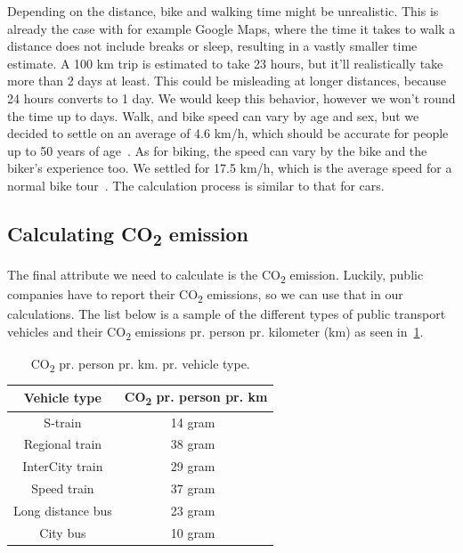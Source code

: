Depending on the distance, bike and walking time might be unrealistic.
This is already the case with for example Google Maps, where the time it takes to walk a distance does not include
breaks or sleep, resulting in a vastly smaller time estimate.
A 100 km trip is estimated to take 23 hours, but it'll realistically take more than 2 days at least.
This could be misleading at longer distances, because 24 hours converts to 1 day.
We would keep this behavior, however we won't round the time up to days.
Walk, and bike speed can vary by age and sex, but we decided to settle on an average of 4.6 km/h, which should be
accurate for people up to 50 years of age~\cite{time_walk}.
As for biking, the speed can vary by the bike and the biker's experience too.
We settled for 17.5 km/h, which is the average speed for a normal bike tour~\cite{time_bike}.
The calculation process is similar to that for cars.

\subsection{Calculating \unit{CO_{2}} emission}\label{subsec:calculating-co2-emission}

The final attribute we need to calculate is the \unit{CO_{2}} emission.
Luckily, public companies have to report their \unit{CO_{2}} emissions, so we can use that in our calculations.
The list below is a sample of the different types of public transport vehicles and their \unit{CO_{2}} emissions pr.
person pr. kilometer (km) as seen in~\ref{tab:emissions}.

\begin{table}[H]
    \centering
    \begin{tabular}{ || c | c || }
        \hline
        Vehicle type & \unit{CO_{2}} pr. person pr. km \\
        \hline\hline
        S-train & 14 gram~\cite{dsb2023} \\
        \hline
        Regional train & 38 gram~\cite{dsb2023} \\
        \hline
        InterCity train & 29 gram~\cite{dsb2023} \\
        \hline
        Speed train & 37 gram~\cite{dsb2023} \\
        \hline
        Long distance bus & 23 gram~\cite{cowi2022} \\
        \hline
        City bus & 10 gram~\cite{ntm2023} \\
        \hline
    \end{tabular}
    \caption{\unit{CO_{2}} pr. person pr. km. pr. vehicle type.}
    \label{tab:emissions}
\end{table}

